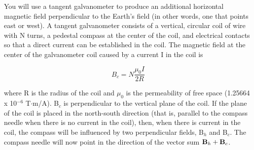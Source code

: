 %
%
%
%

You will use a tangent galvanometer to produce an additional horizontal
magnetic
field perpendicular to the Earth's field (in other words, one that
points east or west).
A tangent galvanometer consists of a vertical, circular coil of wire
with N turns, a pedestal compass at the center of the coil, and electrical
contacts so that a direct current can be established in the coil.
The magnetic field at the center of the galvanometer coil caused by a current
I in the coil is

\begin{equation}
B_c = N\frac{\mu_0I}{2R}
\end{equation}

where R is the radius of the coil and \( \mu _{0} \) is the permeability
of free space (1.25664 x 10\( ^{-6} \) T\( \cdot  \)m/A). B\( _{c} \)
is perpendicular to the vertical plane of the coil. If the plane of
the coil is placed in the north-south direction (that is, parallel
to the compass needle when there is no current in the coil), then,
when there is current in the coil, the compass will be influenced
by two perpendicular fields, B\( _{h} \) and B\( _{c} \). 
The compass needle will now point in the direction of the vector
sum ${\bf B}_h+{\bf B}_c$.  

